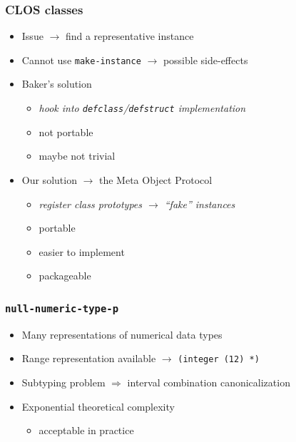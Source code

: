 \documentclass[aspectratio=169]{beamer}
\renewcommand\code[1]{\texttt{#1}}
\newcommand\rarr{\ensuremath{\rightarrow}}
\newcommand\Rarr{\ensuremath{\Rightarrow}}
\newcommand\plus{{\color{watchOS-blue}\faPlus}}
\newcommand\minus{{\color{watchOS-red}\faMinus}}
\begin{document}
\begin{frame}
  \frametitle{CLOS classes}

  \begin{itemize}
  \item Issue \rarr{} find a representative instance
  \item Cannot use \code{make-instance} \rarr{} possible side-effects
    \pause
  \item Baker's solution
    \begin{itemize}
    \item \emph{hook into \code{defclass}/\code{defstruct} implementation}
    \item[\tiny\minus] not portable
    \item[\tiny\minus] maybe not trivial
    \end{itemize}
  \end{itemize}

  \pause

  \begin{itemize}
  \item Our solution \rarr{} the Meta Object Protocol
    \begin{itemize}
    \item \emph{register class prototypes \rarr{} ``fake'' instances}
    \item[\tiny\plus] portable
    \item[\tiny\plus] easier to implement
    \item[\tiny\plus] packageable
    \end{itemize}
  \end{itemize}
\end{frame}


\begin{frame}
  \frametitle{\code{null-numeric-type-p}}
  \begin{itemize}
  \item Many representations of numerical data types
  \item Range representation available \rarr{} \code{(integer (12) *)}
  \item Subtyping problem \Rarr{} interval combination canonicalization
  \item Exponential theoretical complexity
    \begin{itemize}
    \item acceptable in practice
    \end{itemize}
  \end{itemize}
\end{frame}
\end{document}
